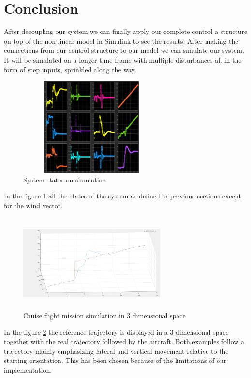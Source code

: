 \documentclass[twocolumn,showpacs,
    nofootinbib,aps,superscriptaddress,
    eqsecnum,prd,showkeys,10pt,floatfix]{revtex4}
\begin{document}
\section{Conclusion}
After decoupling our system we can finally apply our complete control a
structure on top of the non-linear model in Simulink to see the results. After
making the connections from our control structure to our model we can simulate
our system. It will be simulated on a longer time-frame with multiple
disturbances all in the form of step inputs, sprinkled along the way.
\par
\begin{figure} [h]
    \includegraphics[width=75mm,height=50mm]{StatesSimulation.PNG}
    \caption[]{System states on simulation}\label{fig:SIMULINK6}
\end{figure}
In the figure {\ref{fig:SIMULINK6}} all the states of the system as defined in previous sections except for the wind vector.
\begin{figure} [h]
    \includegraphics[width=75mm,height=50mm]{PathFollowing.PNG}
    \caption[]{Cruise flight mission simulation in 3 dimensional space}\label{fig:SIMULINK8}
\end{figure}
In the figure {\ref{fig:SIMULINK8}} the reference trajectory is displayed in a 3 dimensional space together with the real trajectory followed by the aircraft.
Both examples follow a trajectory mainly emphasizing lateral and vertical movement relative to the starting orientation.
This has been chosen because of the limitations of our implementation.
\end{document}
